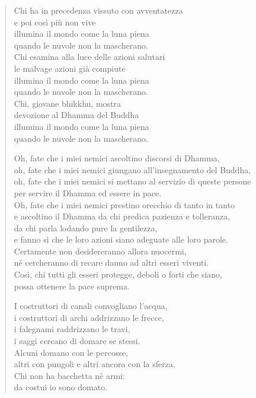 \begin{quote}
Chi ha in precedenza vissuto con avventatezza \\
e poi così più non vive \\
illumina il mondo come la luna piena \\
quando le nuvole non la mascherano. \\
Chi esamina alla luce delle azioni salutari \\
le malvage azioni già compiute \\
illumina il mondo come la luna piena \\
quando le nuvole non la mascherano. \\
Chi, giovane bhikkhu, mostra \\
devozione al Dhamma del Buddha \\
illumina il mondo come la luna piena \\
quando le nuvole non la mascherano.

Oh, fate che i miei nemici ascoltino discorsi di Dhamma, \\
oh, fate che i miei nemici giungano all’insegnamento del Buddha, \\
oh, fate che i miei nemici si mettano al servizio di queste persone \\
per servire il Dhamma ed essere in pace. \\
Oh, fate che i miei nemici prestino orecchio di tanto in tanto \\
e ascoltino il Dhamma da chi predica pazienza e tolleranza, \\
da chi parla lodando pure la gentilezza, \\
e fanno sì che le loro azioni siano adeguate alle loro parole. \\
Certamente non desidereranno allora nuocermi, \\
né cercheranno di recare danno ad altri esseri viventi. \\
Così, chi tutti gli esseri protegge, deboli o forti che siano, \\
possa ottenere la pace suprema.

I costruttori di canali convogliano l’acqua, \\
i costruttori di archi addrizzano le frecce, \\
i falegnami raddrizzano le travi, \\
i saggi cercano di domare se stessi. \\
Alcuni domano con le percosse, \\
altri con pungoli e altri ancora con la sferza. \\
Chi non ha bacchetta né armi: \\
da costui io sono domato.


\end{quote}
